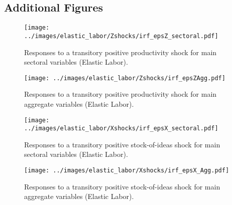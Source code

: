 \documentclass[a4paper,12pt]{article} %
\numberwithin{equation}{section} %
\numberwithin{figure}{section}
\numberwithin{table}{section}
\begin{document}
\newpage
\begin{refsection}
\thispagestyle{plain}
\renewcommand*{\thepage}{A-\arabic{page}} %
\begin{appendices}
\section{Additional Figures}
\label{sec-app:full}

\begin{figure}[H]
  \centering
  \texttt{[image: ../images/elastic\_labor/Zshocks/irf\_epsZ\_sectoral.pdf]}
  \caption{Responses to a transitory positive productivity shock for main sectoral variables (Elastic Labor).}
  \label{fig:multiprod-elastic}
\end{figure}

\begin{figure}[H]
  \centering
  \texttt{[image: ../images/elastic\_labor/Zshocks/irf\_epsZAgg.pdf]}
  \caption{Responses to a transitory positive productivity shock for main aggregate variables (Elastic Labor).}
  \label{fig:aggprod-elastic}
\end{figure}

\begin{figure}[H]
  \centering
  \texttt{[image: ../images/elastic\_labor/Xshocks/irf\_epsX\_sectoral.pdf]}
  \caption{Responses to a transitory positive stock-of-ideas shock for main sectoral variables (Elastic Labor).}
  \label{fig:multistock-elastic}
\end{figure}

\begin{figure}[H]
  \centering
  \texttt{[image: ../images/elastic\_labor/Xshocks/irf\_epsX\_Agg.pdf]}
  \caption{Responses to a transitory positive stock-of-ideas shock for main aggregate variables (Elastic Labor).}
  \label{fig:aggstock-elastic}
\end{figure}


\end{appendices}
\end{refsection}
\end{document}
